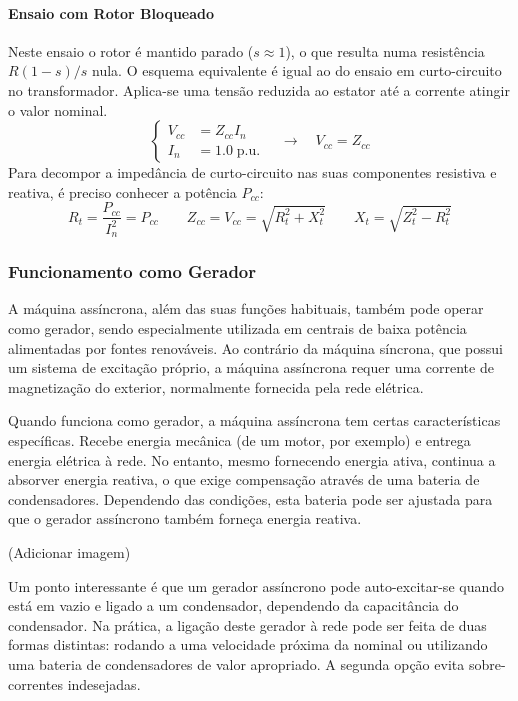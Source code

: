 \paragraph{Ensaio com Rotor Bloqueado}

Neste ensaio o rotor é mantido parado ($s \approx 1$), o que resulta numa resistência $R (1-s)/s$ nula. O esquema equivalente é igual ao do ensaio em curto-circuito no transformador. Aplica-se uma tensão reduzida ao estator até a corrente atingir o valor nominal.
$$
    \left\{\begin{aligned}
        V_{cc} &= Z_{cc} I_n\\
        I_n &= 1.0\; \text{p.u.}
    \end{aligned}\right.\quad\rightarrow\quad
    \boxed{V_{cc} = Z_{cc}} 
$$
\noindent Para decompor a impedância de curto-circuito nas suas componentes resistiva e reativa, é preciso conhecer a potência $P_{cc}$:
$$
    R_t = \dfrac{P_{cc}}{I_n^2} = P_{cc}\qquad
    Z_{cc} = V_{cc} = \sqrt{R_t^2 + X_t^2}\qquad
    X_t = \sqrt{Z_t^2 - R_t^2}
$$
\subsubsection{Funcionamento como Gerador}

A máquina assíncrona, além das suas funções habituais, também pode operar como gerador, sendo especialmente utilizada em centrais de baixa potência alimentadas por fontes renováveis. Ao contrário da máquina síncrona, que possui um sistema de excitação próprio, a máquina assíncrona requer uma corrente de magnetização do exterior, normalmente fornecida pela rede elétrica.

Quando funciona como gerador, a máquina assíncrona tem certas características específicas. Recebe energia mecânica (de um motor, por exemplo) e entrega energia elétrica à rede. No entanto, mesmo fornecendo energia ativa, continua a absorver energia reativa, o que exige compensação através de uma bateria de condensadores. Dependendo das condições, esta bateria pode ser ajustada para que o gerador assíncrono também forneça energia reativa.


\begin{mdframed}
    \vspace{1.5cm}
    \hfil (Adicionar imagem)
    \vspace{1.5cm}
\end{mdframed}


\noindent Um ponto interessante é que um gerador assíncrono pode auto-excitar-se quando está em vazio e ligado a um condensador, dependendo da capacitância do condensador. Na prática, a ligação deste gerador à rede pode ser feita de duas formas distintas: rodando a uma velocidade próxima da nominal ou utilizando uma bateria de condensadores de valor apropriado. A segunda opção evita sobre-correntes indesejadas.

